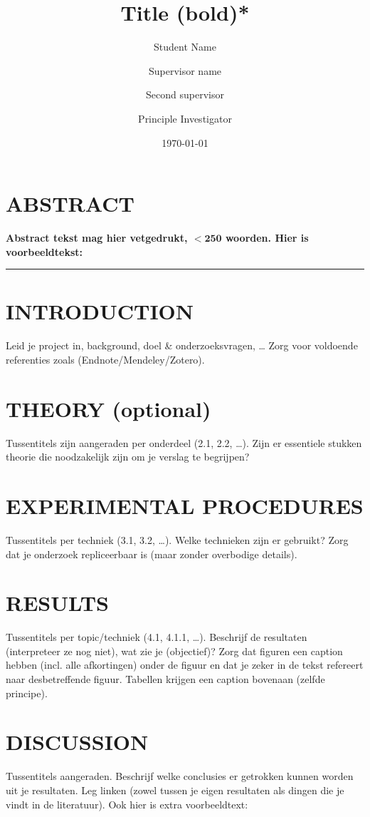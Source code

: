 \documentclass{uhphyspaper}
\title{Title (bold)*}
\date{\today}
\author[1]{Student Name} %
\author[2]{Supervisor name} %
\author[3]{Second supervisor}
\author[4*]{Principle Investigator} %
\affil[1]{UHasselt, Agoralaan, 3590 Diepenbeek, Belgium}
\affil[2, 3]{Specify Group}
\affil[1,4*]{UHasselt, ResearchGroup, Agoralaan, 3590 Diepenbeek, Belgium}
\begin{document}
\maketitle\thispagestyle{fancy} %

\begin{multicols}{2}

\section*{ABSTRACT}
\textbf{Abstract tekst mag hier vetgedrukt, $\mathbf{< 250}$ woorden. 
Hier is voorbeeldtekst: \lipsum[1-1]}
\newline
\rule[1.5ex]{\linewidth}{0.4pt}

\section{INTRODUCTION}
Leid je project in, background, doel \& onderzoeksvragen, \dots 
Zorg voor voldoende referenties zoals \cite{knuth:1984} \cite{latex2e}(Endnote/Mendeley/Zotero).

\section{THEORY (optional)}
Tussentitels zijn aangeraden per onderdeel (2.1, 2.2, \dots).
Zijn er essentiele stukken theorie die noodzakelijk zijn om je verslag te begrijpen?

\section{EXPERIMENTAL PROCEDURES}
Tussentitels per techniek (3.1, 3.2, \dots).
Welke technieken zijn er gebruikt?
Zorg dat je onderzoek repliceerbaar is (maar zonder overbodige details).

\section{RESULTS}
Tussentitels per topic/techniek (4.1, 4.1.1, \dots).
Beschrijf de resultaten (interpreteer ze nog niet), wat zie je (objectief)?
Zorg dat figuren een caption hebben (incl. alle afkortingen) onder de figuur en dat je zeker in de tekst refereert naar desbetreffende figuur. 
Tabellen krijgen een caption bovenaan (zelfde principe).

\section{DISCUSSION}
Tussentitels aangeraden.
Beschrijf welke conclusies er getrokken kunnen worden uit je resultaten. 
Leg linken (zowel tussen je eigen resultaten als dingen die je vindt in de literatuur).
\npar
Ook hier is extra voorbeeldtext: \lipsum[1-1]


\end{multicols}
\end{document}
